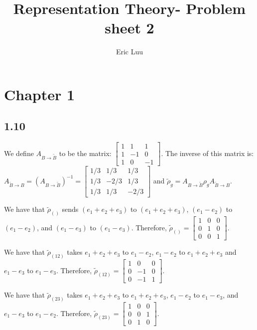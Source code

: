 \documentclass[]{article}
\title{Representation Theory- Problem sheet 2}
\author{Eric Luu}
\begin{document}
\maketitle

\section*{Chapter 1}
\subsection*{1.10}
We define $A_{B \rightarrow \tilde{B}}$ to be the matrix:
$
\begin{bmatrix}
	1 & 1 & 1\\
	1 & -1 & 0\\
	1 & 0 & -1
\end{bmatrix}
$.
The inverse of this matrix is:
$A_{\tilde{B} \rightarrow B} = (A_{B \rightarrow \tilde{B}})^{-1} = 
\begin{bmatrix}
	1/3 & 1/3 & 1/3\\
	1/3 & -2/3 & 1/3\\
	1/3 & 1/3 & -2/3
\end{bmatrix}
$
and $\tilde{\rho}_g = A_{B \rightarrow \tilde{B}} \rho_g A_{\tilde{B} \rightarrow B}$. 

We have that $\tilde{\rho}_{()}$ sends $(e_1 + e_2 + e_3)$ to $(e_1 + e_2 + e_3)$, $(e_1 - e_2)$ to $(e_1 - e_2)$, and $(e_1 - e_3)$ to $(e_1 - e_3)$. Therefore, $\tilde{\rho}_{()} = 
\begin{bmatrix}
	1 & 0 & 0\\
	0 & 1 & 0\\
	0 & 0 & 1
\end{bmatrix}
$.

We have that $\tilde{\rho}_{(12)}$ takes $e_1 + e_2 + e_3$ to $e_1 - e_2$, $e_1 - e_2$ to $e_1 + e_2 + e_3$ and $e_1 - e_3$ to $e_1 - e_3$. Therefore, 
$\tilde{\rho}_{(12)} = 
\begin{bmatrix}
	1 & 0 & 0\\
	0 & -1 & 0\\
	0 & -1 & 1
\end{bmatrix}
$.

We have that $\tilde{\rho}_{(23)}$ takes $e_1 + e_2 + e_3$ to $e_1 + e_2 + e_3$, $e_1 - e_2$ to $e_1 - e_3$, and $e_1 - e_3$ to $e_1 - e_2$. Therefore, 
$\tilde{\rho}_{(23)} = 
\begin{bmatrix}
	1 & 0 & 0\\
	0 & 0 & 1\\
	0 & 1 & 0
\end{bmatrix}
$.
\end{document}
